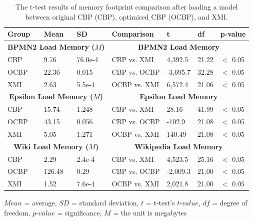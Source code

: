\documentclass{llncs}
\begin{document}
     \begin{table}[t]
        \footnotesize
        \centering
        \caption{The t-test results of memory footprint comparison after loading a model between original CBP (CBP), optimised CBP (OCBP), and XMI.}
        \label{table:ttest_results_load_memory}
        \begin{tabular}
            {|p{}p{}p{}|p{}p{}p{}p{}|}
            \hline 
            
            Group & Mean & SD & Comparison & t  & df & p-value \\
            \hline 
            \multicolumn{3}{|c|}{\textbf{BPMN2 Load Memory ($M$)}} & \multicolumn{4}{c|}{\textbf{BPMN2 Load Memory}} \\
            CBP & 9.76     & 76.0e-4 & CBP vs. XMI &  4,392.5   & 21.22 & $<$ 0.05 \\  
            OCBP & 22.36   & 0.015 & CBP vs. OCBP & -3,695.7 & 32.28  & $<$ 0.05 \\  
            XMI &  2.63   & 5.5e-4 & OCBP vs. XMI &  6,572.4    & 21.06  & $<$ 0.05 \\ 
            \hline 
            
            \multicolumn{3}{|c|}{\textbf{Epsilon Load Memory ($M$)}} & \multicolumn{4}{c|}{\textbf{Epsilon Load Memory}} \\
            CBP &15.74    & 1.248 &  CBP vs. XMI & 28.16   &  41.99 & $<$ 0.05 \\
            OCBP & 43.15   & 0.056 & CBP vs. OCBP & -102.9 &21.08 & $<$ 0.05 \\  
            XMI & 5.05   & 1.271 & OCBP vs. XMI & 140.49  & 21.08  & $<$ 0.05 \\ 
            \hline 
            
            \multicolumn{3}{|c|}{\textbf{Wiki Load Memory ($M$)}} & \multicolumn{4}{c|}{\textbf{Wikipedia Load Memory}} \\
            CBP & 2.29  & 2.4e-4 & CBP vs. XMI &   4,523.5   & 25.16 & $<$ 0.05 \\ 
            OCBP & 126.48 & 0.29 & CBP vs. OCBP &   -2,009.3 & 21.00 & $<$ 0.05 \\ 
            XMI &  1.52  & 7.6e-4 & OCBP vs. XMI &  2,021.8  & 21.00 & $<$ 0.05 \\ 
            \hline
        \end{tabular}
        \justify
        $Mean$ = average, $SD$ = standard deviation, $t$ = t-test's $t$-$value$, $df$ = degree of freedom, $p$-$value$ = significance, $M$ = the unit is megabytes
    \end{table}
\end{document}
